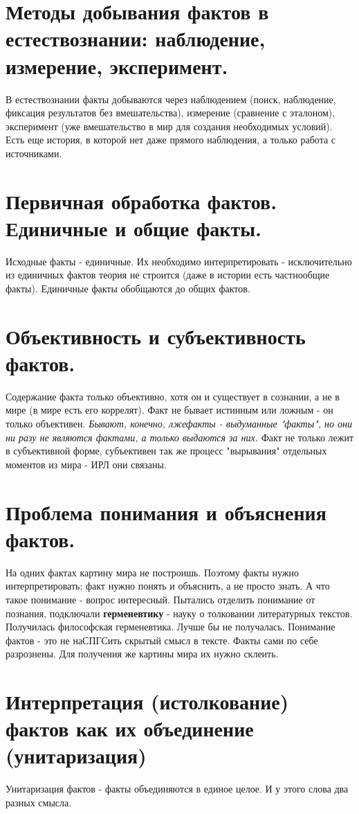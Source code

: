 \section{ Методы добывания фактов в естествознании: наблюдение, измерение, эксперимент.}
В естествознании факты добываются через наблюдением (поиск, наблюдение, фиксация результатов без вмешательства), измерение (сравнение с эталоном), эксперимент (уже вмешательство в мир для создания необходимых условий). Есть еще история, в которой нет даже прямого наблюдения, а только работа с источниками.

\section{ Первичная обработка фактов. Единичные и общие факты.}
Исходные факты - единичные. Их необходимо интерпретировать - исключительно из единичных фактов теория не строится (даже в истории есть частнообщие факты). Единичные факты обобщаются до общих фактов.

\section{ Объективность и субъективность фактов.}
Содержание факта только объективно, хотя он и существует в сознании, а не в мире (в мире есть его коррелят). Факт не бывает истинным или ложным - он только объективен. \textit{Бывают, конечно, лжефакты - выдуманные "факты", но они ни разу не являются фактами, а только выдаются за них.} Факт не только лежит в субъективной форме, субъективен так же процесс "вырывания" отдельных моментов из мира - ИРЛ они связаны.

\section{ Проблема понимания и объяснения фактов.}
На одних фактах картину мира не построишь. Поэтому факты нужно интерпретировать; факт нужно понять и объяснить, а не просто знать. А что такое понимание - вопрос интересный. Пытались отделить понимание от познания, подключали \textbf{герменевтику} - науку о толковании литературных текстов. Получилась философская герменевтика. Лучше бы не получалась. Понимание фактов - это не наСПГСить скрытый смысл в тексте. Факты сами по себе разрознены. Для получения же картины мира их нужно склеить.

\section{ Интерпретация (истолкование) фактов как их объединение (унитаризация)}
Унитаризация фактов - факты объединяются в единое целое. И у этого слова два разных смысла.

